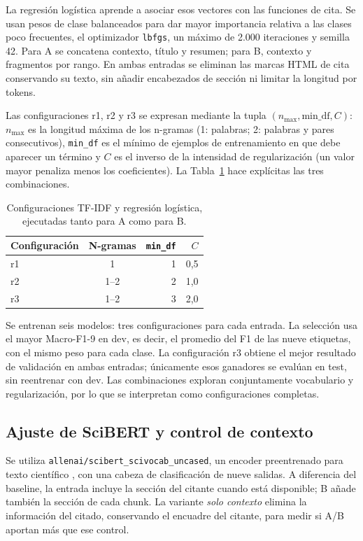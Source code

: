 \documentclass[10pt,a4paper,twocolumn]{article}
\begin{document}
La regresión logística aprende a asociar esos vectores con las funciones de cita. Se usan pesos de clase balanceados para dar mayor importancia relativa a las clases poco frecuentes, el optimizador \texttt{lbfgs}, un máximo de 2.000 iteraciones y semilla 42. Para A se concatena contexto, título y resumen; para B, contexto y fragmentos por rango. En ambas entradas se eliminan las marcas HTML de cita conservando su texto, sin añadir encabezados de sección ni limitar la longitud por tokens.

Las configuraciones r1, r2 y r3 se expresan mediante la tupla $(n_{\max},\mathrm{min\_df},C)$: $n_{\max}$ es la longitud máxima de los n-gramas (1: palabras; 2: palabras y pares consecutivos), \texttt{min\_df} es el mínimo de ejemplos de entrenamiento en que debe aparecer un término y $C$ es el inverso de la intensidad de regularización (un valor mayor penaliza menos los coeficientes). La Tabla~\ref{tab:tfconfig} hace explícitas las tres combinaciones.

\begin{table}[t]
\centering\small
\caption{Configuraciones TF-IDF y regresión logística, ejecutadas tanto para A como para B.}\label{tab:tfconfig}
\begin{tabular}{lcrr}\toprule
Configuración & N-gramas & \texttt{min\_df} & $C$\\\midrule
r1 & 1 & 1 & 0,5\\
r2 & 1--2 & 2 & 1,0\\
r3 & 1--2 & 3 & 2,0\\\bottomrule
\end{tabular}
\end{table}

Se entrenan seis modelos: tres configuraciones para cada entrada. La selección usa el mayor Macro-F1-9 en dev, es decir, el promedio del F1 de las nueve etiquetas, con el mismo peso para cada clase. La configuración r3 obtiene el mejor resultado de validación en ambas entradas; únicamente esos ganadores se evalúan en test, sin reentrenar con dev. Las combinaciones exploran conjuntamente vocabulario y regularización, por lo que se interpretan como configuraciones completas.

\subsection{Ajuste de SciBERT y control de contexto}
Se utiliza \texttt{allenai/scibert\_scivocab\_uncased}, un encoder preentrenado para texto científico \cite{Beltagy2019}, con una cabeza de clasificación de nueve salidas. A diferencia del baseline, la entrada incluye la sección del citante cuando está disponible; B añade también la sección de cada chunk. La variante \emph{solo contexto} elimina la información del citado, conservando el encuadre del citante, para medir si A/B aportan más que ese control.
\end{document}
